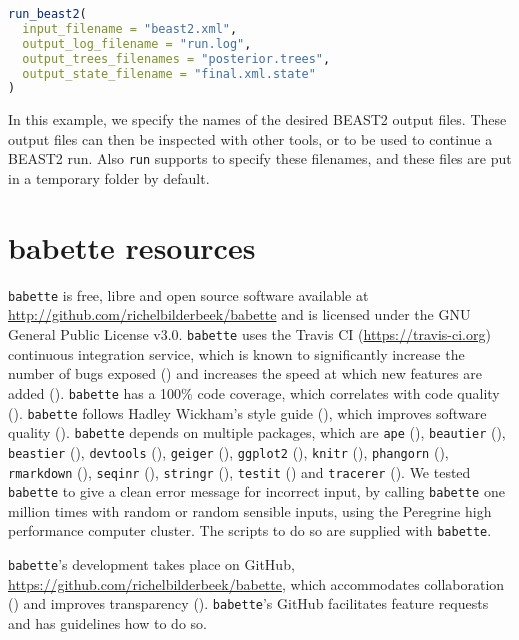 \documentclass{article}
\begin{document}
\begin{lstlisting}[language=R, floatplacement=H]
run_beast2(
  input_filename = "beast2.xml",
  output_log_filename = "run.log",
  output_trees_filenames = "posterior.trees",
  output_state_filename = "final.xml.state"
)
\end{lstlisting}
In this example, we specify the names of the desired BEAST2 output files.
These output files can then be inspected with other tools, or to be used
to continue a BEAST2 run. Also \verb;run; supports to specify these filenames,
and these files are put in a temporary folder by default. 

\section{babette resources}

\verb;babette; is free, libre and open source software available at 
\url{http://github.com/richelbilderbeek/babette}
and is licensed under the GNU General Public License v3.0.
\verb;babette; uses the Travis CI (\url{https://travis-ci.org})
continuous integration service, which is known to significantly 
increase the number of bugs exposed (\cite{vasilescu2015}) and increases
the speed at which new features are added (\cite{vasilescu2015}).
\verb;babette; has a 100\% code coverage, which correlates with 
code quality (\cite{horgan1994,del1995correlation}). 
\verb;babette; follows Hadley Wickham's style guide (\cite{style_guide}), 
which improves software quality (\cite{fang2001}).
\verb;babette; depends on multiple packages, which are 
\verb;ape; (\cite{APE}), 
\verb;beautier; (\cite{beautier}),
\verb;beastier; (\cite{beastier}),
\verb;devtools; (\cite{devtools}),
\verb;geiger; (\cite{GEIGER}),
\verb;ggplot2; (\cite{ggplot2}),
\verb;knitr; (\cite{knitr}),
\verb;phangorn; (\cite{phangorn}),
\verb;rmarkdown; (\cite{rmarkdown}),
\verb;seqinr; (\cite{seqinr}),
\verb;stringr; (\cite{stringr}),
\verb;testit; (\cite{testit}) and 
\verb;tracerer; (\cite{tracerer}).
We tested \verb;babette; to give a clean 
error message for incorrect input, by
calling \verb;babette; one million times
with random or random sensible inputs, 
using the Peregrine high performance computer cluster. 
The scripts to do so are supplied with \verb;babette;.

\verb;babette;'s development takes place on GitHub,
\url{https://github.com/richelbilderbeek/babette}, 
which accommodates collaboration (\cite{perez2016ten}) 
and improves transparency (\cite{gorgolewski2016practical}).
\verb;babette;'s GitHub facilitates feature requests and 
has guidelines how to do so.
\end{document}
